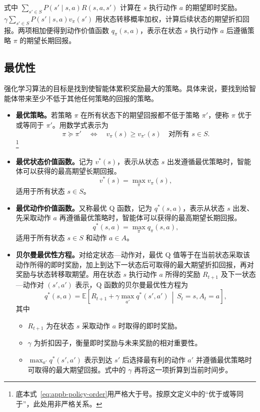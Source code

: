式中 $\sum_{s'\in S}P(s'\mid s,a)R(s,a,s')$ 计算在 $s$ 执行动作 $a$ 的期望即时奖励。$\gamma\sum_{s'\in S}P(s'\mid s,a)v_\pi(s')$ 用状态转移概率加权，计算后续状态的期望折扣回报。两项相加便得到动作价值函数 $q_\pi(s,a)$，表示在状态 $s$ 执行动作 $a$ 后遵循策略 $\pi$ 的期望长期回报。

\subsection{最优性}
强化学习算法的目标是找到使智能体累积奖励最大的策略。具体来说，要找到给智能体带来至少不低于其他任何策略的回报的策略。
\begin{itemize}
\item \textbf{最优策略。}若策略 $\pi$ 在所有状态下的期望回报都不低于策略 $\pi'$，便称 $\pi$ 优于或等同于 $\pi'$。用数学式表示为
\begin{equation}
\pi\succeq\pi'
\quad\Longleftrightarrow\quad
v_\pi(s)\geq v_{\pi'}(s)\quad\text{对所有 }s\in S.
\label{eq:appb-policy-order}
\end{equation}
\footnote{底本式~\eqref{eq:appb-policy-order}用严格大于号。按原文定义中的“优于或等同于”，此处用非严格关系。}
\item \textbf{最优状态价值函数。}记为 $v^*(s)$，表示从状态 $s$ 出发遵循最优策略时，智能体可以获得的最高期望长期回报。
\begin{equation}
v^*(s)=\max_{\pi}v_\pi(s),
\label{eq:appb-optimal-state-value}
\end{equation}
适用于所有状态 $s\in S$。
\item \textbf{最优动作价值函数。}又称最优 Q 函数，记为 $q^*(s,a)$，表示从状态 $s$ 出发、先采取动作 $a$ 再遵循最优策略时，智能体可以获得的最高期望长期回报。
\begin{equation}
q^*(s,a)=\max_{\pi}q_\pi(s,a),
\label{eq:appb-optimal-action-value}
\end{equation}
适用于所有状态 $s\in S$ 和动作 $a\in A$。
\item \textbf{贝尔曼最优性方程。}对给定状态—动作对，最优 Q 值等于在当前状态采取该动作所得的即时奖励，加上到达下一状态后可取得的最大期望折扣回报，再对奖励与状态转移取期望。用在状态 $s$ 执行动作 $a$ 所得的奖励 $R_{t+1}$ 及下一状态—动作对 $(s',a')$ 表示，Q 函数的贝尔曼最优性方程为
\begin{equation}
q^*(s,a)=\mathbb{E}\left[
R_{t+1}+\gamma\max_{a'}q^*(s',a')\,\middle|\, S_t=s,A_t=a
\right],
\label{eq:appb-bellman-optimal}
\end{equation}
其中
\begin{itemize}
\item $R_{t+1}$ 为在状态 $s$ 采取动作 $a$ 时取得的即时奖励。
\item $\gamma$ 为折扣因子，衡量即时奖励与未来奖励的相对重要性。
\item $\max_{a'}q^*(s',a')$ 表示到达 $s'$ 后选择最有利的动作 $a'$ 并遵循最优策略时可取得的最大期望回报。式中的 $\gamma$ 再将这一项折算到当前时间步。
\end{itemize}
\end{itemize}

